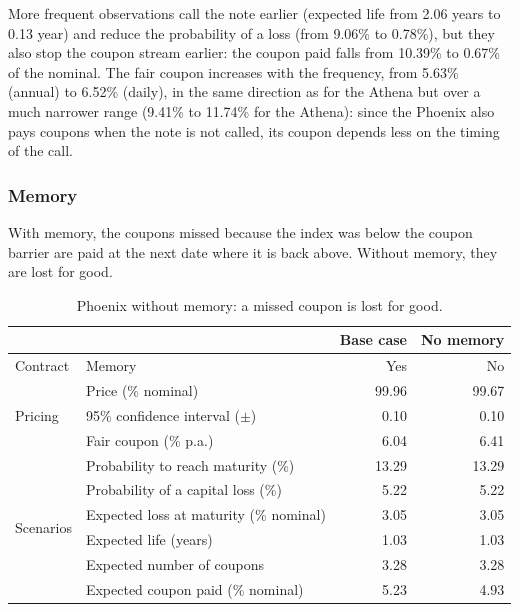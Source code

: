 \documentclass[11pt,a4paper]{article}
\begin{document}
More frequent observations call the note earlier (expected life from 2.06 years to 0.13 year) and reduce the
probability of a loss (from 9.06\% to 0.78\%), but they also stop the coupon stream earlier: the coupon paid falls from
10.39\% to 0.67\% of the nominal. The fair coupon increases with the frequency, from 5.63\% (annual) to 6.52\%
(daily), in the same direction as for the Athena but over a much narrower range (9.41\% to 11.74\% for the Athena):
since the Phoenix also pays coupons when the note is not called, its coupon depends less on the timing of the call.

\clearpage
\subsubsection{Memory}

With memory, the coupons missed because the index was below the coupon barrier are paid at the next date where it is
back above. Without memory, they are lost for good.

\begin{table}[htbp]
  \centering
  \small
  \begin{tabular}{llrr}
    \toprule
     & & \textbf{Base case} & \textbf{No memory} \\
    \midrule
    \multirow{1}{*}{Contract}
      & Memory & Yes & No \\
    \midrule
    \multirow{3}{*}{Pricing}
      & Price (\% nominal) & 99.96 & 99.67 \\
      & 95\% confidence interval ($\pm$) & 0.10 & 0.10 \\
      & Fair coupon (\% p.a.) & 6.04 & 6.41 \\
    \midrule
    \multirow{6}{*}{Scenarios}
      & Probability to reach maturity (\%) & 13.29 & 13.29 \\
      & Probability of a capital loss (\%) & 5.22 & 5.22 \\
      & Expected loss at maturity (\% nominal) & 3.05 & 3.05 \\
      & Expected life (years) & 1.03 & 1.03 \\
      & Expected number of coupons & 3.28 & 3.28 \\
      & Expected coupon paid (\% nominal) & 5.23 & 4.93 \\
    \bottomrule
  \end{tabular}
  \caption{Phoenix without memory: a missed coupon is lost for good.}
  \label{tab:phoenix-memory}
\end{table}
\end{document}
